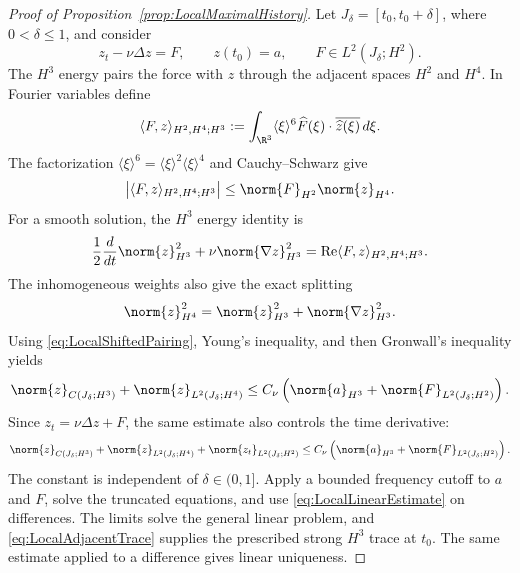 \begin{proof}[Proof of Proposition~\ref{prop:LocalMaximalHistory}]
Let \(J_\delta=[t_0,t_0+\delta]\), where \(0<\delta\leq1\), and consider
\[
  z_t-\nu\Delta z=F,
  \qquad
  z(t_0)=a,
  \qquad
  F\in L^2(J_\delta;H^2).
\]
The \(H^3\) energy pairs the force with \(z\) through the adjacent spaces
\(H^2\) and \(H^4\). In Fourier variables define
\[
  \langle F,z\rangle_{H^2,H^4;H^3}
  :=\int_{\R^3}\langle\xi\rangle^6
       \widehat F(\xi)\cdot\overline{\widehat z(\xi)}\,d\xi.
\]
The factorization
\(
  \langle\xi\rangle^6
  =\langle\xi\rangle^2\langle\xi\rangle^4
\)
and Cauchy--Schwarz give
\begin{equation}
  \left|\langle F,z\rangle_{H^2,H^4;H^3}\right|
  \leq\norm{F}_{H^2}\norm{z}_{H^4}.
  \label{eq:LocalShiftedPairing}
\end{equation}
For a smooth solution, the \(H^3\) energy identity is
\[
  \frac12\frac d{dt}\norm{z}_{H^3}^2
  +\nu\norm{\nabla z}_{H^3}^2
  =\operatorname{Re}\langle F,z\rangle_{H^2,H^4;H^3}.
\]
The inhomogeneous weights also give the exact splitting
\[
  \norm{z}_{H^4}^2
  =\norm{z}_{H^3}^2+\norm{\nabla z}_{H^3}^2.
\]
Using \eqref{eq:LocalShiftedPairing}, Young's inequality, and then Gronwall's
inequality yields
\[
  \norm{z}_{C(J_\delta;H^3)}
  +\norm{z}_{L^2(J_\delta;H^4)}
  \leq
  C_\nu\left(
    \norm{a}_{H^3}+\norm{F}_{L^2(J_\delta;H^2)}
  \right).
\]
Since \(z_t=\nu\Delta z+F\), the same estimate also controls the time derivative:
\begin{equation}
  \norm{z}_{C(J_\delta;H^3)}
  +\norm{z}_{L^2(J_\delta;H^4)}
  +\norm{z_t}_{L^2(J_\delta;H^2)}
  \leq
  C_\nu\left(
    \norm{a}_{H^3}+\norm{F}_{L^2(J_\delta;H^2)}
  \right).
  \label{eq:LocalLinearEstimate}
\end{equation}
The constant is independent of \(\delta\in(0,1]\). Apply a bounded frequency
cutoff to \(a\) and \(F\), solve the truncated equations, and use
\eqref{eq:LocalLinearEstimate} on differences. The limits solve the general
linear problem, and \eqref{eq:LocalAdjacentTrace} supplies the prescribed
strong \(H^3\) trace at \(t_0\). The same estimate applied to a difference
gives linear uniqueness.



\end{proof}
